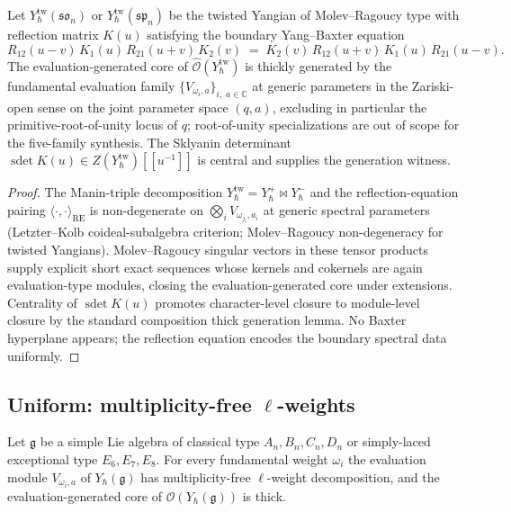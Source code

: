 \begin{proposition}
\label{prop:mc3-type-BCD-reflection-shapovalov-platonic}
%
%
%
Let $Y^{\mathrm{tw}}_\hbar(\mathfrak{so}_n)$ or
$Y^{\mathrm{tw}}_\hbar(\mathfrak{sp}_n)$ be the twisted Yangian of
Molev--Ragoucy type with reflection matrix $K(u)$ satisfying the
boundary Yang--Baxter equation
\[
 R_{12}(u-v)\,K_1(u)\,R_{21}(u+v)\,K_2(v) \;=\;
 K_2(v)\,R_{12}(u+v)\,K_1(u)\,R_{21}(u-v).
\]
The evaluation-generated core of
$\widehat{\mathcal{O}}(Y^{\mathrm{tw}}_\hbar)$ is thickly generated
by the fundamental evaluation family
$\{V_{\omega_i,a}\}_{i,\;a\in\mathbb{C}}$ at generic
parameters in the Zariski-open sense on the joint parameter space
$(q, a)$, excluding in particular the primitive-root-of-unity
locus of $q$; root-of-unity specializations are out of scope for
the five-family synthesis. The Sklyanin
determinant
$\operatorname{sdet}K(u) \in Z(Y^{\mathrm{tw}}_\hbar)[[u^{-1}]]$ is
central and supplies the generation witness.
\end{proposition}

\begin{proof}
The Manin-triple decomposition
$Y^{\mathrm{tw}}_\hbar = Y^+_\hbar \bowtie Y^-_\hbar$ and the
reflection-equation pairing
$\langle\cdot,\cdot\rangle_{\mathrm{RE}}$ is non-degenerate on
$\bigotimes_i V_{\omega_{j_i},a_i}$ at generic spectral parameters
(Letzter--Kolb coideal-subalgebra criterion; Molev--Ragoucy
non-degeneracy for twisted Yangians). Molev--Ragoucy singular
vectors in these tensor products supply explicit short exact
sequences whose kernels and cokernels are again evaluation-type
modules, closing the evaluation-generated core under extensions.
Centrality of $\operatorname{sdet}K(u)$ promotes character-level
closure to module-level closure by the standard composition thick
generation lemma. No Baxter hyperplane appears; the reflection
equation encodes the boundary spectral data uniformly.
\end{proof}

\subsection{Uniform: multiplicity-free $\ell$-weights}

\begin{proposition}
\label{prop:mc3-uniform-chari-moura-platonic}
%
%
%
Let $\mathfrak{g}$ be a simple Lie algebra of classical type
$A_n, B_n, C_n, D_n$ or simply-laced exceptional type
$E_6, E_7, E_8$. For every fundamental weight $\omega_i$ the
evaluation module $V_{\omega_i,a}$ of
$Y_\hbar(\mathfrak{g})$ has multiplicity-free $\ell$-weight
decomposition, and the evaluation-generated core of
$\mathcal{O}(Y_\hbar(\mathfrak{g}))$ is thick.
\end{proposition}

